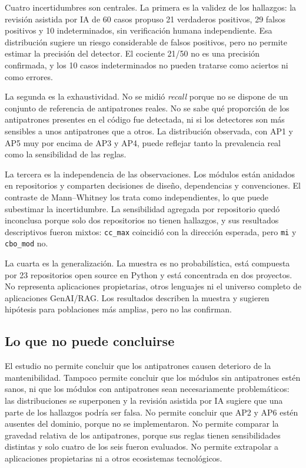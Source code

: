 Cuatro incertidumbres son centrales. La primera es la validez de los hallazgos: la revisión asistida por IA de 60 casos propuso 21 verdaderos positivos, 29 falsos positivos y 10 indeterminados, sin verificación humana independiente. Esa distribución sugiere un riesgo considerable de falsos positivos, pero no permite estimar la precisión del detector. El cociente 21/50 no es una precisión confirmada, y los 10 casos indeterminados no pueden tratarse como aciertos ni como errores.

La segunda es la exhaustividad. No se midió \emph{recall} porque no se dispone de un conjunto de referencia de antipatrones reales. No se sabe qué proporción de los antipatrones presentes en el código fue detectada, ni si los detectores son más sensibles a unos antipatrones que a otros. La distribución observada, con AP1 y AP5 muy por encima de AP3 y AP4, puede reflejar tanto la prevalencia real como la sensibilidad de las reglas.

La tercera es la independencia de las observaciones. Los módulos están anidados en repositorios y comparten decisiones de diseño, dependencias y convenciones. El contraste de Mann--Whitney los trata como independientes, lo que puede subestimar la incertidumbre. La sensibilidad agregada por repositorio quedó inconclusa porque solo dos repositorios no tienen hallazgos, y sus resultados descriptivos fueron mixtos: \texttt{cc\_max} coincidió con la dirección esperada, pero \texttt{mi} y \texttt{cbo\_mod} no.

La cuarta es la generalización. La muestra es no probabilística, está compuesta por 23 repositorios open source en Python y está concentrada en dos proyectos. No representa aplicaciones propietarias, otros lenguajes ni el universo completo de aplicaciones GenAI/RAG. Los resultados describen la muestra y sugieren hipótesis para poblaciones más amplias, pero no las confirman.

\subsection{Lo que no puede concluirse}

El estudio no permite concluir que los antipatrones causen deterioro de la mantenibilidad. Tampoco permite concluir que los módulos sin antipatrones estén sanos, ni que los módulos con antipatrones sean necesariamente problemáticos: las distribuciones se superponen y la revisión asistida por IA sugiere que una parte de los hallazgos podría ser falsa. No permite concluir que AP2 y AP6 estén ausentes del dominio, porque no se implementaron. No permite comparar la gravedad relativa de los antipatrones, porque sus reglas tienen sensibilidades distintas y solo cuatro de los seis fueron evaluados. No permite extrapolar a aplicaciones propietarias ni a otros ecosistemas tecnológicos.

